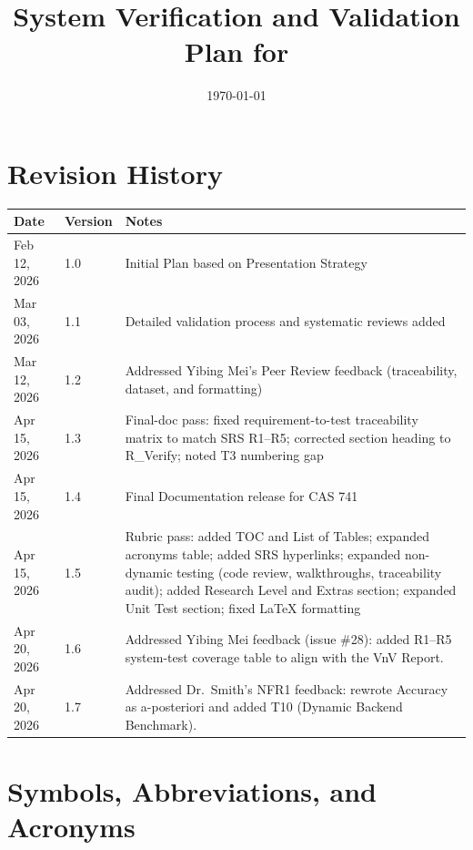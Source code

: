 \documentclass[12pt, titlepage]{article}
\begin{document}
\title{System Verification and Validation Plan for \progname{}} 
\author{\authname}
\date{\today}
        
\maketitle


\tableofcontents

\listoftables

\newpage

\section*{Revision History}

\begin{tabularx}{\textwidth}{p{3cm}p{2cm}X}
\toprule {\bf Date} & {\bf Version} & {\bf Notes}\\
\midrule
Feb 12, 2026 & 1.0 & Initial Plan based on Presentation Strategy\\
Mar 03, 2026 & 1.1 & Detailed validation process and systematic reviews added\\
Mar 12, 2026 & 1.2 & Addressed Yibing Mei's Peer Review feedback (traceability, dataset, and formatting)\\
Apr 15, 2026 & 1.3 & Final-doc pass: fixed requirement-to-test traceability matrix to match SRS R1--R5; corrected section heading to R\_Verify; noted T3 numbering gap\\
Apr 15, 2026 & 1.4 & Final Documentation release for CAS 741\\
Apr 15, 2026 & 1.5 & Rubric pass: added TOC and List of Tables; expanded acronyms table; added SRS hyperlinks; expanded non-dynamic testing (code review, walkthroughs, traceability audit); added Research Level and Extras section; expanded Unit Test section; fixed LaTeX formatting\\
Apr 20, 2026 & 1.6 & Addressed Yibing Mei feedback (issue \#28): added R1--R5 system-test coverage table to align with the VnV Report.\\
Apr 20, 2026 & 1.7 & Addressed Dr.\ Smith's NFR1 feedback: rewrote Accuracy as a-posteriori and added T10 (Dynamic Backend Benchmark).\\
\bottomrule
\end{tabularx}

\newpage

\section{Symbols, Abbreviations, and Acronyms}
\end{document}
